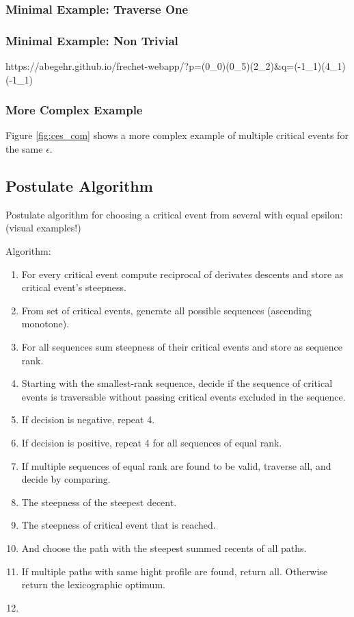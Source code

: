 \subsubsection{Minimal Example: Traverse One}


\subsubsection{Minimal Example: Non Trivial}
https://abegehr.github.io/frechet-webapp/?p=(0_0)(0_5)(2_2)&q=(-1_1)(4_1)(-1_1)


\subsubsection{More Complex Example}

Figure \ref{fig:ces_com} shows a more complex example of multiple critical events for the same $\epsilon$. 



\subsection{Postulate Algorithm}
Postulate algorithm for choosing a critical event from several with equal epsilon: (visual examples!)

Algorithm:
\begin{enumerate}
	\item For every critical event compute reciprocal of derivates descents and store as critical event's steepness.
	\item From set of critical events, generate all possible sequences (ascending monotone).
	\item For all sequences sum steepness of their critical events and store as sequence rank.
	\item Starting with the smallest-rank sequence, decide if the sequence of critical events is traversable without passing critical events excluded in the sequence.
	\item If decision is negative, repeat 4.
	\item If decision is positive, repeat 4 for all sequences of equal rank.
	\item If multiple sequences of equal rank are found to be valid, traverse all, and decide by comparing.
	\item The steepness of the steepest decent.
	\item The steepness of critical event that is reached.
	\item And choose the path with the steepest summed recents of all paths.
	\item If multiple paths with same hight profile are found, return all. Otherwise return the lexicographic optimum.
	\item 
\end{enumerate}

